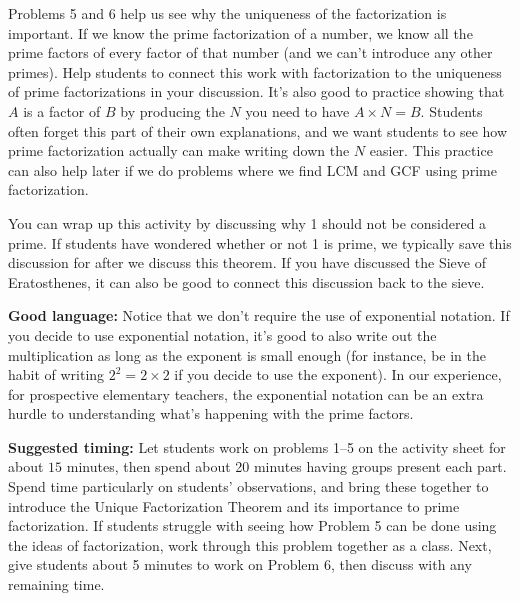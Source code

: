 \documentclass[noauthor, nooutcomes, handout]{ximera}
\begin{document}
\begin{instructorNotes}
Problems 5 and 6 help us see why the uniqueness of the factorization is important. If we know the prime factorization of a number, we know all the prime factors of every factor of that number (and we can't introduce any other primes). Help students to connect this work with factorization to the uniqueness of prime factorizations in your discussion. It's also good to practice showing that $A$ is a factor of $B$ by producing the $N$ you need to have $A \times N = B$. Students often forget this part of their own explanations, and we want students to see how prime factorization actually can make writing down the $N$ easier. This practice can also help later if we do problems where we find LCM and GCF using prime factorization.


You can wrap up this activity by discussing why 1 should not be considered a prime.  If students have wondered whether or not 1 is prime, we typically save this discussion for after we discuss this theorem. If you have discussed the Sieve of Eratosthenes, it can also be good to connect this discussion back to the sieve.

{\bf Good language:} Notice that we don't require the use of exponential notation. If you decide to use exponential notation, it's good to also write out the multiplication as long as the exponent is small enough (for instance, be in the habit of writing $2^2 = 2 \times 2$ if you decide to use the exponent). In our experience, for prospective elementary teachers, the exponential notation can be an extra hurdle to understanding what's happening with the prime factors.




{\bf Suggested timing: }  Let students work on problems 1--5 on the activity sheet for about $15$ minutes, then spend about 20 minutes having groups present each part. Spend time particularly on students' observations, and bring these together to introduce the Unique Factorization Theorem and its importance to prime factorization. If students struggle with seeing how Problem 5 can be done using the ideas of factorization, work through this problem together as a class. Next, give students about 5 minutes to work on Problem 6, then discuss with any remaining time.


\end{instructorNotes}
\end{document}

